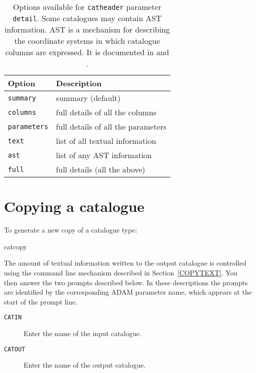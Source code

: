 \documentclass[twoside,11pt]{starlink}
\begin{document}
\begin{table}[htbp]

\begin{center}
\begin{tabular}{ll}
Option           & Description \\ \hline
\texttt{summary}    & summary (default) \\
\texttt{columns}    & full details of all the columns\\
\texttt{parameters} & full details of all the parameters\\
\texttt{text}       & list of all textual information \\
\texttt{ast}        & list of any AST information \\
\texttt{full}       & full details (all the above) \\
\end{tabular}
\end{center}

\begin{quote}
\caption[Options available for \texttt{catheader} parameter \texttt{detail}]
{Options available for \texttt{catheader} parameter \texttt{detail}.  Some
catalogues may contain AST information.  AST is a mechanism for describing
the coordinate systems in which catalogue columns are expressed.  It is
documented in \cite{SUN210} and
\cite{SUN211}.
\label{HEADERDET} }
\end{quote}

\end{table}


\section{\label{COPY}Copying a catalogue}

To generate a new copy of a catalogue type:

\begin{terminalv}
catcopy
\end{terminalv}

The amount of textual information written to the output catalogue is
controlled using the command line mechanism described in
Section~\ref{COPYTEXT}.  You then answer the two prompts described below.
In these descriptions the prompts are identified by the corresponding
ADAM parameter name, which appears at the start of the prompt line.

\begin{description}

  \item[ \texttt{CATIN} ] Enter the name of the input catalogue.

  \item[ \texttt{CATOUT} ] Enter the name of the output catalogue.

\end{description}
\end{document}
